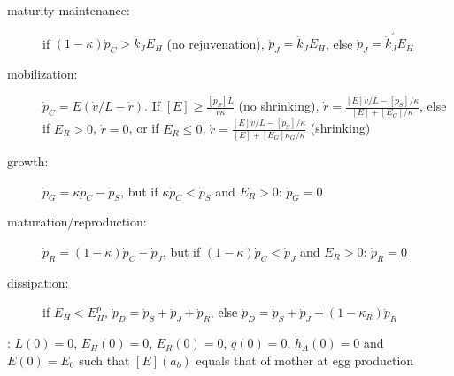 {\begin{description}
	\item[maturity maintenance: ] if $(1 - \kappa) \dot{p}_C > \dot{k}_J E_H$ (no rejuvenation), 
	  $\dot{p}_J = \dot{k}_J E_H$, else $\dot{p}_J = \dot{k}_J^\prime E_H$
		
	\item[mobilization: ] $\dot{p}_C = E (\dot{v}/ L - \dot{r})$. 
	  If $[E] \ge \frac{[\dot{p}_S] L} {\dot{v} \kappa}$ (no shrinking), 
		  $\dot{r} = \frac{[E] \dot{v}/ L - [\dot{p}_S]/ \kappa} {[E] + [E_G]/ \kappa}$, 
		else if $E_R > 0$, $\dot{r} = 0$, or if $E_R \le 0$, 
		  $\dot{r} = \frac{[E] \dot{v}/ L - [\dot{p}_S]/ \kappa} {[E] + [E_G] \kappa_G/ \kappa}$ (shrinking)

	\item[growth: ] $\dot{p}_G = \kappa \dot{p}_C - \dot{p}_S$, 
	  but if $\kappa \dot{p}_C < \dot{p}_S$ and $E_R > 0$: $\dot{p}_G = 0$

  \item[maturation/reproduction: ] $\dot{p}_R = (1 - \kappa) \dot{p}_C - \dot{p}_J$, 
	  but if $(1 - \kappa) \dot{p}_C < \dot{p}_J$ and $E_R > 0$: $\dot{p}_R = 0$

	\item[dissipation: ] if $E_H < E_H^p$, $\dot{p}_D = \dot{p}_S + \dot{p}_J + \dot{p}_R$,  
	  else $\dot{p}_D = \dot{p}_S + \dot{p}_J + (1 - \kappa_R) \dot{p}_R$
\end{description}}
		
		
\vspace*{5mm}: {\small
$L(0) = 0$, $E_H(0) = 0$, $E_R(0) = 0$, $\ddot{q}(0) = 0$, $\dot{h}_A(0) = 0$ and $E(0) = E_0$ 
  such that $[E](a_b)$ equals that of mother at egg production}

